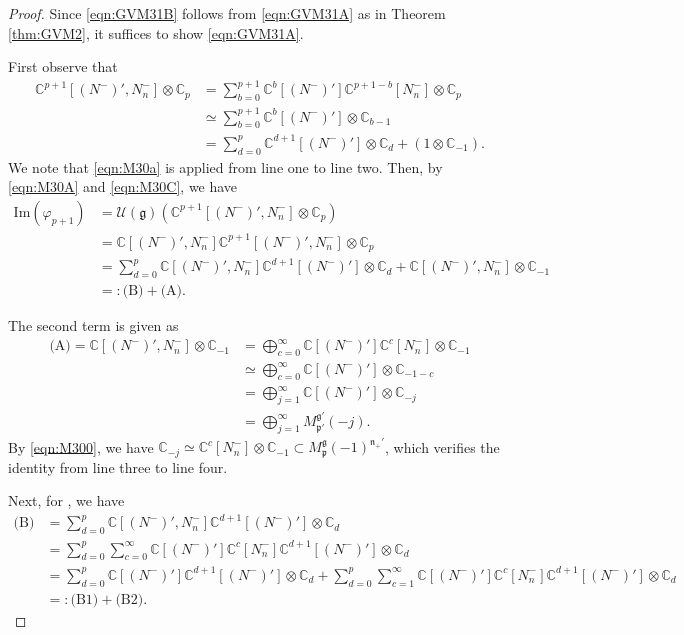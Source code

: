 \documentclass[10pt,a4paper]{amsart}
\newcommand{\C}{\mathbb{C}}
\newcommand{\Cal}{\mathcal}
\renewcommand{\Im}{\mathrm{Im}}
\newcommand{\Mp}{M^{\fg}_{\fp}}
\newcommand{\Mpp}{M^{\fg'}_{\fp'}}
\newcommand{\Nn}{N_n^-}
\newcommand{\Np}{(N^-)'}
\newcommand{\fg}{{\mathfrak g}}
\newcommand{\fn}{{\mathfrak n}}
\newcommand{\fp}{{\mathfrak p}}
\begin{document}
\begin{proof}
Since \eqref{eqn:GVM31B} follows from \eqref{eqn:GVM31A}
as in Theorem \ref{thm:GVM2}, it suffices to show \eqref{eqn:GVM31A}.

First observe that
\begin{align}
\C^{p+1}[(N^-)', N_n^-]\otimes \C_p
&=\sum_{b=0}^{p+1}\C^b[\Np]\C^{p+1-b}[\Nn]\otimes \C_p \nonumber \\
&\simeq \sum_{b=0}^{p+1}\C^b[\Np]\otimes \C_{b-1} \nonumber \\
&=\sum_{d=0}^p \C^{d+1}[\Np] \otimes \C_d + (1\otimes \C_{-1}).
\label{eqn:M30C}
\end{align}
We note that \eqref{eqn:M30a} is applied from line one to line two.
Then, by \eqref{eqn:M30A} and \eqref{eqn:M30C}, we have
\begin{align}
\Im(\varphi_{p+1})
&=\Cal{U}(\fg)\left(\C^{p+1}[(N^-)', N_n^-] \otimes \C_p\right) \nonumber \\
&=\C[\Np,\Nn]\C^{p+1}[(N^-)', N_n^-] \otimes \C_p \nonumber \\
&=\sum_{d=0}^p \C[\Np,\Nn]\C^{d+1}[\Np] \otimes \C_d 
+ \C[\Np,\Nn]\otimes \C_{-1} \label{eqn:M30E}\\
&=: \text{(B)} + \text{(A)}.\label{eqn:M31A}
\end{align}

The second term  is given as
\begin{align}
\text{(A)}
= \C[\Np,\Nn]\otimes \C_{-1}
&=\bigoplus_{c=0}^\infty \C[\Np]\C^c[\Nn]\otimes \C_{-1} \nonumber\\
&\simeq \bigoplus_{c=0}^\infty\C[\Np]\otimes \C_{-1-c} \nonumber\\
&=\bigoplus_{j=1}^\infty\C[\Np]\otimes \C_{-j} \nonumber\\
&=\bigoplus_{j=1}^\infty\Mpp(-j).\label{eqn:M30F}
\end{align}
By \eqref{eqn:M300}, we have
$\C_{-j}\simeq \C^c[\Nn]\otimes \C_{-1} \subset \Mp(-1)^{\fn_+'}$,
which verifies the identity from line three to line four.

Next, for , we have 
\begin{align}
\text{(B)}
&=\sum_{d=0}^p \C[\Np,\Nn]\C^{d+1}[\Np] \otimes \C_d \nonumber \\
&=\sum_{d=0}^p\sum_{c=0}^\infty \C[\Np]\C^c[\Nn]\C^{d+1}[\Np]\otimes \C_d
\nonumber\\
&=\sum_{d=0}^p\C[\Np]\C^{d+1}[\Np]\otimes \C_d
+
\sum_{d=0}^p\sum_{c=1}^\infty \C[\Np]\C^c[\Nn]\C^{d+1}[\Np]\otimes \C_d
\nonumber \\
&=:\text{(B1)} + \text{(B2)}.\label{eqn:M30G}
\end{align}


\end{proof}
\end{document}
